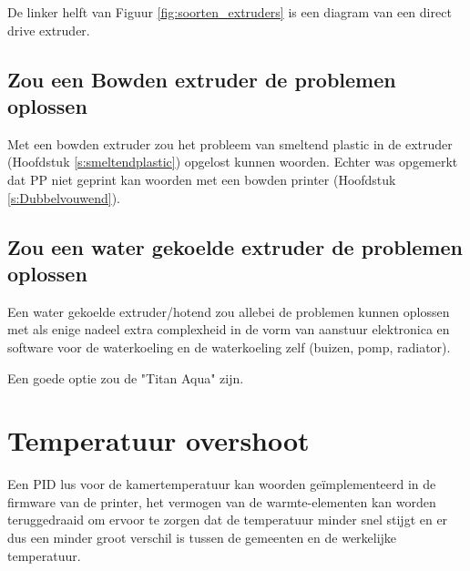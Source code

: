 De linker helft van Figuur \ref{fig:soorten_extruders} \cite{soorten_extruders}
is een diagram van een direct drive extruder.


\subsection{Zou een Bowden extruder de problemen oplossen}

Met een bowden extruder zou het probleem van smeltend plastic in de extruder
(Hoofdstuk \ref{s:smeltendplastic}) opgelost kunnen woorden. Echter was
opgemerkt dat PP niet geprint kan woorden met een bowden printer (Hoofdstuk
\ref{s:Dubbelvouwend}).

\subsection{Zou een water gekoelde extruder de problemen oplossen}

Een water gekoelde extruder/hotend zou allebei de problemen kunnen oplossen met
als enige nadeel extra complexheid in de vorm van aanstuur elektronica en
software voor de waterkoeling en de waterkoeling zelf (buizen, pomp, radiator).

Een goede optie zou de "Titan Aqua" \cite{titanaqua} zijn.


\section{Temperatuur overshoot}

Een \ac{PID} lus voor de kamertemperatuur kan woorden geïmplementeerd in de
firmware van de printer, het vermogen van de warmte-elementen kan worden
teruggedraaid om ervoor te zorgen dat de temperatuur minder snel stijgt en er
dus een minder groot verschil is tussen de gemeenten en de werkelijke
temperatuur.
